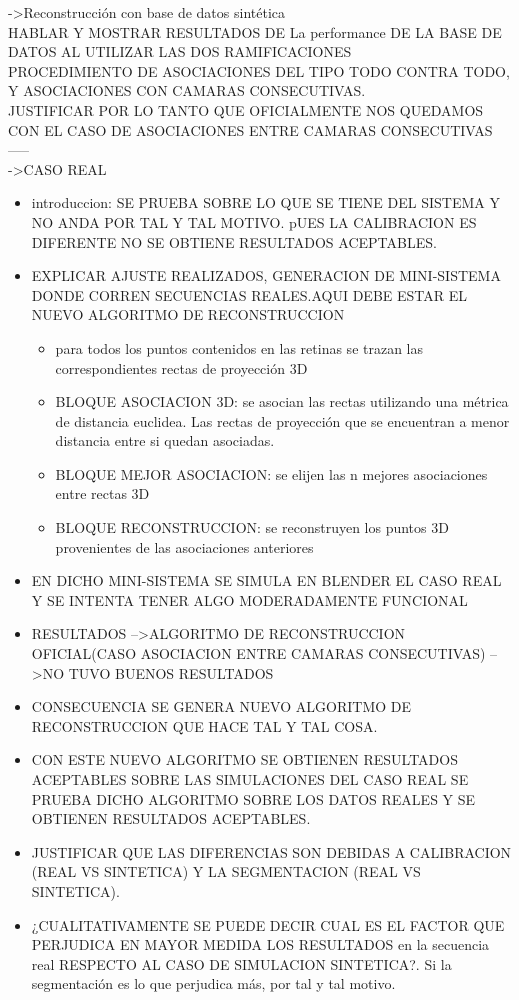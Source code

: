 ->Reconstrucción con base de datos sintética
\\
HABLAR Y MOSTRAR RESULTADOS DE La performance DE LA BASE DE DATOS AL UTILIZAR LAS DOS RAMIFICACIONES\\
PROCEDIMIENTO DE ASOCIACIONES DEL TIPO TODO CONTRA TODO, Y ASOCIACIONES CON CAMARAS CONSECUTIVAS.\\
JUSTIFICAR POR LO TANTO QUE OFICIALMENTE NOS QUEDAMOS CON EL CASO DE ASOCIACIONES ENTRE CAMARAS CONSECUTIVAS
\\
-----\\
->CASO REAL
\\
\begin{itemize}
\item introduccion: SE PRUEBA SOBRE LO QUE SE TIENE DEL SISTEMA Y NO ANDA POR TAL Y TAL MOTIVO. pUES LA CALIBRACION ES DIFERENTE NO SE OBTIENE RESULTADOS ACEPTABLES.

\item EXPLICAR AJUSTE REALIZADOS, GENERACION DE MINI-SISTEMA DONDE CORREN SECUENCIAS REALES.AQUI DEBE ESTAR EL NUEVO ALGORITMO DE RECONSTRUCCION
\begin{itemize}
\item para todos los puntos contenidos en las retinas se trazan las correspondientes rectas de proyección 3D
\item BLOQUE ASOCIACION 3D: se asocian las rectas utilizando una métrica de distancia euclidea. Las rectas de proyección que se encuentran a menor distancia entre si quedan asociadas.
\item BLOQUE MEJOR ASOCIACION: se elijen las n mejores asociaciones entre rectas 3D
\item BLOQUE RECONSTRUCCION: se reconstruyen los puntos 3D provenientes de las asociaciones anteriores 
\end{itemize}

\item EN DICHO MINI-SISTEMA SE SIMULA EN BLENDER EL CASO REAL Y SE INTENTA TENER ALGO MODERADAMENTE FUNCIONAL

\item RESULTADOS -->ALGORITMO DE RECONSTRUCCION OFICIAL(CASO ASOCIACION ENTRE CAMARAS CONSECUTIVAS) -->NO TUVO BUENOS RESULTADOS 
\item CONSECUENCIA SE GENERA NUEVO ALGORITMO DE RECONSTRUCCION QUE HACE TAL Y TAL COSA.
\item CON ESTE NUEVO ALGORITMO SE OBTIENEN RESULTADOS ACEPTABLES SOBRE LAS SIMULACIONES DEL CASO REAL
SE PRUEBA DICHO ALGORITMO SOBRE LOS DATOS REALES Y SE OBTIENEN RESULTADOS ACEPTABLES.
\item JUSTIFICAR QUE LAS DIFERENCIAS SON DEBIDAS A CALIBRACION (REAL VS SINTETICA) Y LA SEGMENTACION (REAL VS SINTETICA).
\item ¿CUALITATIVAMENTE SE PUEDE DECIR CUAL ES EL FACTOR QUE PERJUDICA EN MAYOR MEDIDA LOS RESULTADOS en la secuencia real RESPECTO AL CASO DE SIMULACION SINTETICA?. Si la segmentación es lo que perjudica más, por tal y tal motivo.
\end{itemize}

